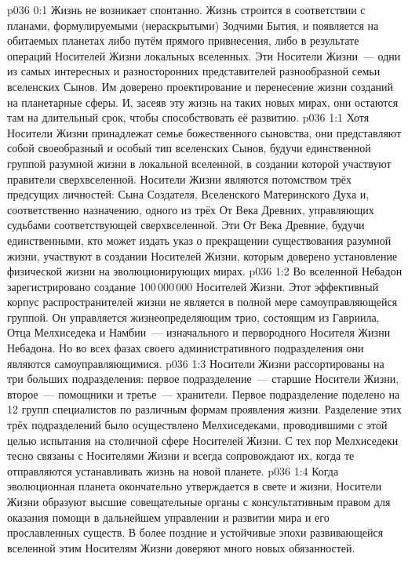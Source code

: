 \author{Сын-Ворондадек}
\vs p036 0:1 Жизнь не возникает спонтанно. Жизнь строится в соответствии с планами, формулируемыми (нераскрытыми) Зодчими Бытия, и появляется на обитаемых планетах либо путём прямого привнесения, либо в результате операций Носителей Жизни локальных вселенных. Эти Носители Жизни~--- одни из самых интересных и разносторонних представителей разнообразной семьи вселенских Сынов. Им доверено проектирование и перенесение жизни созданий на планетарные сферы. И, засеяв эту жизнь на таких новых мирах, они остаются там на длительный срок, чтобы способствовать её развитию.
\vs p036 1:1 Хотя Носители Жизни принадлежат семье божественного сыновства, они представляют собой своеобразный и особый тип вселенских Сынов, будучи единственной группой разумной жизни в локальной вселенной, в создании которой участвуют правители сверхвселенной. Носители Жизни являются потомством трёх предсущих личностей: Сына Создателя, Вселенского Материнского Духа и, соответственно назначению, одного из трёх От Века Древних, управляющих судьбами соответствующей сверхвселенной. Эти От Века Древние, будучи единственными, кто может издать указ о прекращении существования разумной жизни, участвуют в создании Носителей Жизни, которым доверено установление физической жизни на эволюционирующих мирах.
\vs p036 1:2 Во вселенной Небадон зарегистрировано создание 100\,000\,000 Носителей Жизни. Этот эффективный корпус распространителей жизни не является в полной мере самоуправляющейся группой. Он управляется жизнеопределяющим трио, состоящим из Гавриила, Отца Мелхиседека и Намбии~--- изначального и первородного Носителя Жизни Небадона. Но во всех фазах своего административного подразделения они являются самоуправляющимися.
\vs p036 1:3 Носители Жизни рассортированы на три больших подразделения: первое подразделение~--- старшие Носители Жизни, второе~--- помощники и третье~--- хранители. Первое подразделение поделено на 12 групп специалистов по различным формам проявления жизни. Разделение этих трёх подразделений было осуществлено Мелхиседеками, проводившими с этой целью испытания на столичной сфере Носителей Жизни. С тех пор Мелхиседеки тесно связаны с Носителями Жизни и всегда сопровождают их, когда те отправляются устанавливать жизнь на новой планете.
\vs p036 1:4 Когда эволюционная планета окончательно утверждается в свете и жизни, Носители Жизни образуют высшие совещательные органы с консультативным правом для оказания помощи в дальнейшем управлении и развитии мира и его прославленных существ. В более поздние и устойчивые эпохи развивающейся вселенной этим Носителям Жизни доверяют много новых обязанностей.
